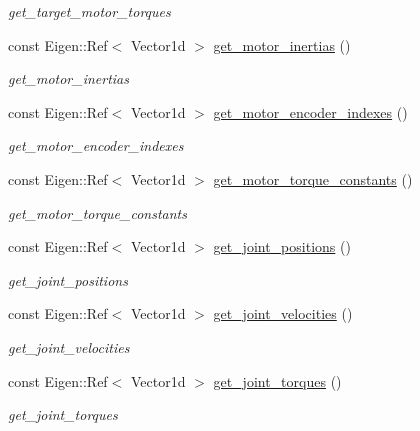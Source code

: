 \begin{DoxyCompactItemize}
\begin{DoxyCompactList}\small\item\em get\+\_\+target\+\_\+motor\+\_\+torques \end{DoxyCompactList}\item 
const Eigen\+::\+Ref$<$ Vector1d $>$ \hyperlink{classblmc__robots_1_1SingleMotor_a7126966be33a93491dcf10d62f711768}{get\+\_\+motor\+\_\+inertias} ()
\begin{DoxyCompactList}\small\item\em get\+\_\+motor\+\_\+inertias \end{DoxyCompactList}\item 
const Eigen\+::\+Ref$<$ Vector1d $>$ \hyperlink{classblmc__robots_1_1SingleMotor_a1a7ff027c499ed3fc164a399e5b498e1}{get\+\_\+motor\+\_\+encoder\+\_\+indexes} ()
\begin{DoxyCompactList}\small\item\em get\+\_\+motor\+\_\+encoder\+\_\+indexes \end{DoxyCompactList}\item 
const Eigen\+::\+Ref$<$ Vector1d $>$ \hyperlink{classblmc__robots_1_1SingleMotor_ac368bb72104b1a2e076142d4002740fb}{get\+\_\+motor\+\_\+torque\+\_\+constants} ()
\begin{DoxyCompactList}\small\item\em get\+\_\+motor\+\_\+torque\+\_\+constants \end{DoxyCompactList}\item 
const Eigen\+::\+Ref$<$ Vector1d $>$ \hyperlink{classblmc__robots_1_1SingleMotor_a4d458d18608fbca78baf6331d27a431b}{get\+\_\+joint\+\_\+positions} ()
\begin{DoxyCompactList}\small\item\em get\+\_\+joint\+\_\+positions \end{DoxyCompactList}\item 
const Eigen\+::\+Ref$<$ Vector1d $>$ \hyperlink{classblmc__robots_1_1SingleMotor_a9a2997aaadecda0b30530d8d5afeaddf}{get\+\_\+joint\+\_\+velocities} ()
\begin{DoxyCompactList}\small\item\em get\+\_\+joint\+\_\+velocities \end{DoxyCompactList}\item 
const Eigen\+::\+Ref$<$ Vector1d $>$ \hyperlink{classblmc__robots_1_1SingleMotor_a7ac6ae993e59e6f2ea5f83a643184a9e}{get\+\_\+joint\+\_\+torques} ()
\begin{DoxyCompactList}\small\item\em get\+\_\+joint\+\_\+torques \end{DoxyCompactList}\item 

\end{DoxyCompactItemize}
